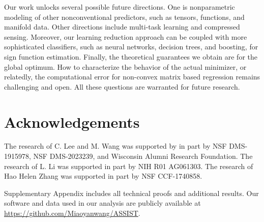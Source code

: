 \documentclass[aos]{imsart}
\theoremstyle{definition}
\def\NonparaM{\text{\bf \footnotesize ASSIST }}
\begin{document}
Our work unlocks several possible future directions. One is nonparametric modeling of other nonconventional predictors, such as tensors, functions, and manifold data. Other directions include multi-task learning and compressed sensing. Moreover, our learning reduction approach can be coupled with more sophisticated classifiers, such as neural networks, decision trees, and boosting, for sign function estimation. Finally, the theoretical guarantees we obtain are for the global optimum. How to characterize the behavior of the actual minimizer, or relatedly, the computational error for non-convex matrix based regression remains challenging and open. All these questions are warranted for future research. 





\section*{Acknowledgements}
The research of C. Lee and M. Wang was supported by in part by NSF DMS-1915978, NSF DMS-2023239, and Wisconsin Alumni Research Foundation. The research of L. Li was supported in part by NIH R01 AG061303. The research of Hao Helen Zhang was supported in part by NSF CCF-1740858. 





\begin{supplement}
Supplementary Appendix includes all technical proofs and additional results. Our software {\bf \NonparaM} and data used in our analysis are publicly available at \url{https://github.com/Miaoyanwang/ASSIST}.
\end{supplement}





 
       
\end{document}

